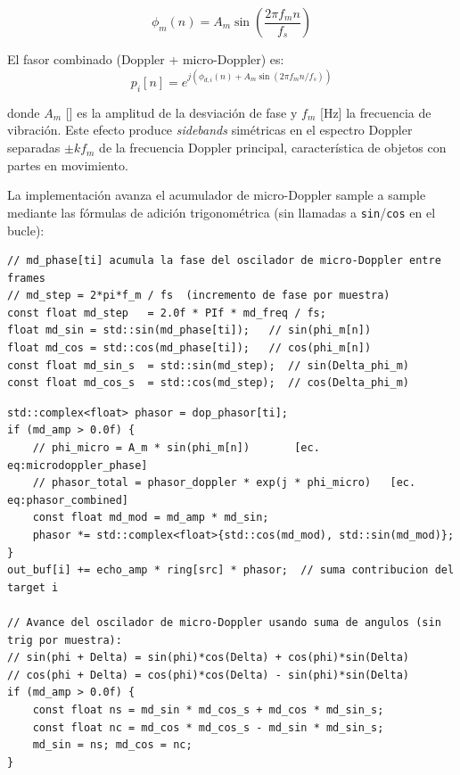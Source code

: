 \documentclass[11pt,a4paper]{article}
\begin{document}
\begin{equation}
  \phi_m(n) = A_m \sin\!\left(\frac{2\pi f_m n}{f_s}\right)
  \label{eq:microdoppler_phase}
\end{equation}

El fasor combinado (Doppler + micro-Doppler) es:
\begin{equation}
  p_i[n] = e^{j\left(\phi_{d,i}(n) + A_m \sin(2\pi f_m n / f_s)\right)}
  \label{eq:phasor_combined}
\end{equation}

donde $A_m$ [] es la amplitud de la desviación de fase y $f_m$ [Hz] la frecuencia
de vibración. Este efecto produce \textit{sidebands} simétricas en el espectro Doppler
separadas $\pm k f_m$ de la frecuencia Doppler principal, característica de objetos
con partes en movimiento.

La implementación avanza el acumulador de micro-Doppler sample a sample mediante las
fórmulas de adición trigonométrica (sin llamadas a \texttt{sin}/\texttt{cos} en el bucle):

\begin{lstlisting}[style=cpp,
  caption={Inicialización del acumulador micro-Doppler — ChannelSimulator.cpp, líneas 149--154}]
// md_phase[ti] acumula la fase del oscilador de micro-Doppler entre frames
// md_step = 2*pi*f_m / fs  (incremento de fase por muestra)
const float md_step   = 2.0f * PIf * md_freq / fs;
float md_sin = std::sin(md_phase[ti]);   // sin(phi_m[n])
float md_cos = std::cos(md_phase[ti]);   // cos(phi_m[n])
const float md_sin_s  = std::sin(md_step);  // sin(Delta_phi_m)
const float md_cos_s  = std::cos(md_step);  // cos(Delta_phi_m)
\end{lstlisting}

\begin{lstlisting}[style=cpp,
  caption={Aplicación del micro-Doppler al fasor — ChannelSimulator.cpp, líneas 161--178}]
std::complex<float> phasor = dop_phasor[ti];
if (md_amp > 0.0f) {
    // phi_micro = A_m * sin(phi_m[n])       [ec. eq:microdoppler_phase]
    // phasor_total = phasor_doppler * exp(j * phi_micro)   [ec. eq:phasor_combined]
    const float md_mod = md_amp * md_sin;
    phasor *= std::complex<float>{std::cos(md_mod), std::sin(md_mod)};
}
out_buf[i] += echo_amp * ring[src] * phasor;  // suma contribucion del target i

// Avance del oscilador de micro-Doppler usando suma de angulos (sin trig por muestra):
// sin(phi + Delta) = sin(phi)*cos(Delta) + cos(phi)*sin(Delta)
// cos(phi + Delta) = cos(phi)*cos(Delta) - sin(phi)*sin(Delta)
if (md_amp > 0.0f) {
    const float ns = md_sin * md_cos_s + md_cos * md_sin_s;
    const float nc = md_cos * md_cos_s - md_sin * md_sin_s;
    md_sin = ns; md_cos = nc;
}
\end{lstlisting}
\end{document}
